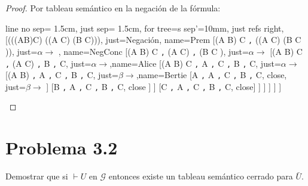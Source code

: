 \documentclass[letterpaper,12pt]{memoir}
\theoremstyle{definition}
\begin{document}
\begin{proof}
  Por tableau semántico en la negación de la fórmula:\\
  \noindent

  \begin{tableau}
    {
      line no sep= 1.5cm,
      just sep= 1.5cm,
      for tree={s sep'=10mm},
      just refs right, %
    }
    [\neg(((A\land B)\rightarrow C) \rightarrow ((A \rightarrow C) \lor (B \rightarrow C))), just={Negación}, name=Prem
    [(A \land B) \rightarrow C \texttt{,} \neg((A \rightarrow C) \lor (B \rightarrow C )), just={\(\alpha \rightarrow\) }, name=NegConc
    [(A \land B) \rightarrow C \texttt{,} \neg(A \rightarrow C) \texttt{,} \neg(B \rightarrow C ), just={\(\alpha \rightarrow\)}
    [(A \land B) \rightarrow C \texttt{,} \neg(A \rightarrow C) \texttt{,} B \texttt{,} \neg C, just={\(\alpha \rightarrow\)},name=Alice
    [(A \land B) \rightarrow C \texttt{,} A \texttt{,} \neg C \texttt{,} B \texttt{,} \neg C, just={\(\alpha \rightarrow\)}
    [\neg(A \land B) \texttt{,} A \texttt{,} \neg C \texttt{,} B \texttt{,} \neg C, just={\(\beta \rightarrow\)},name=Bertie
    [\neg A \texttt{,} A \texttt{,} \neg C \texttt{,} B \texttt{,} \neg C, close, just={\(\beta \rightarrow\)}
    ]
    [\neg B \texttt{,} A \texttt{,} \neg C \texttt{,} B \texttt{,} \neg C, close
    ]
    ]
    [C \texttt{,} A \texttt{,} \neg C \texttt{,} B \texttt{,} \neg C, close]
    ]
    ]
    ]
    ]
    ]
  \end{tableau}
  \newline
\end{proof}


\section*{Problema 3.2}

Demostrar que si \(\vdash U\) en \(\mathcal{G}\) entonces existe un tableau semántico cerrado para \(\bar{U}\). 
\end{document}
